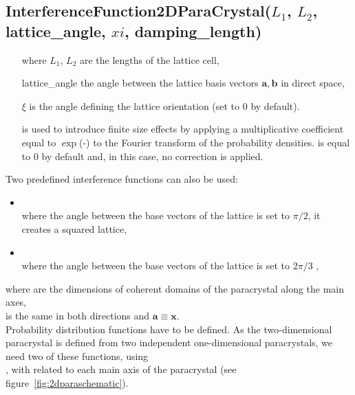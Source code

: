 \FloatBarrier

\newpage%
\subsection{InterferenceFunction2DParaCrystal($L_1$, $L_2$, lattice\_angle, $xi$, damping\_length)} %
\begin{itemize}
\item[where] $L_1$, $L_2$ are the lengths of the lattice cell,
\item[] lattice\_angle the angle between the lattice basis vectors $\mathbf{a}, \mathbf{b}$ in direct space,
\item[] $\xi$ is the angle defining the lattice orientation (set to $0$ by default).
\item[]  is used to introduce finite size effects by applying a multiplicative coefficient equal to  $\exp$(-) to the Fourier transform of the probability densities.  is equal to 0 by default and, in this case, no correction is applied.
\end{itemize}
Two predefined interference functions can also be used:
\begin{itemize}
\item  {}\\
where the angle between the base vectors of the lattice is set to $\pi/2$,
it creates a squared lattice,
\item {}\\
where the angle between the base vectors of the lattice is set to $2\pi/3$ ,
\end{itemize}
where
 are the dimensions of coherent domains of the paracrystal along the main axes,\\  is the same in both directions and $\mathbf{a}\equiv \mathbf{x}$.\\

Probability distribution functions have to be defined. As the two-dimensional paracrystal is defined from two independent one-dimensional paracrystals, we need two of these functions, using\\ , with  related to each main axis of the paracrystal (see figure~\ref{fig:2dparaschematic}).


